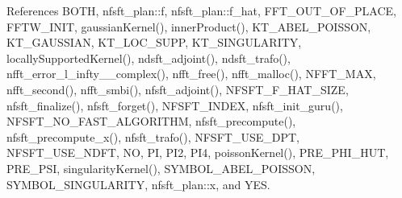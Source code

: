 References BOTH, nfsft\_\-plan::f, nfsft\_\-plan::f\_\-hat, FFT\_\-OUT\_\-OF\_\-PLACE, FFTW\_\-INIT, gaussianKernel(), innerProduct(), KT\_\-ABEL\_\-POISSON, KT\_\-GAUSSIAN, KT\_\-LOC\_\-SUPP, KT\_\-SINGULARITY, locallySupportedKernel(), ndsft\_\-adjoint(), ndsft\_\-trafo(), nfft\_\-error\_\-l\_\-infty\_\_\-complex(), nfft\_\-free(), nfft\_\-malloc(), NFFT\_\-MAX, nfft\_\-second(), nfft\_\-smbi(), nfsft\_\-adjoint(), NFSFT\_\-F\_\-HAT\_\-SIZE, nfsft\_\-finalize(), nfsft\_\-forget(), NFSFT\_\-INDEX, nfsft\_\-init\_\-guru(), NFSFT\_\-NO\_\-FAST\_\-ALGORITHM, nfsft\_\-precompute(), nfsft\_\-precompute\_\-x(), nfsft\_\-trafo(), NFSFT\_\-USE\_\-DPT, NFSFT\_\-USE\_\-NDFT, NO, PI, PI2, PI4, poissonKernel(), PRE\_\-PHI\_\-HUT, PRE\_\-PSI, singularityKernel(), SYMBOL\_\-ABEL\_\-POISSON, SYMBOL\_\-SINGULARITY, nfsft\_\-plan::x, and YES.